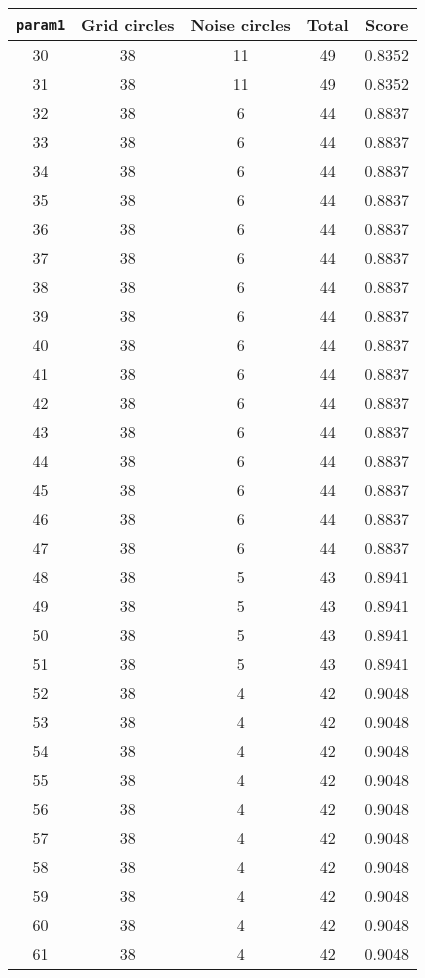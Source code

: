 \documentclass[letterpaper, 12pt]{article}
\begin{document}
\begin{longtable}{|c|c|c|c|c|}
\hline
\textbf{\texttt{param1}} & \textbf{Grid circles} & \textbf{Noise circles} & \textbf{Total} & \textbf{Score} \\
\hline
30 & 38 & 11 & 49 & 0.8352 \\
\hline
31 & 38 & 11 & 49 & 0.8352 \\
\hline
32 & 38 & 6 & 44 & 0.8837 \\
\hline
33 & 38 & 6 & 44 & 0.8837 \\
\hline
34 & 38 & 6 & 44 & 0.8837 \\
\hline
35 & 38 & 6 & 44 & 0.8837 \\
\hline
36 & 38 & 6 & 44 & 0.8837 \\
\hline
37 & 38 & 6 & 44 & 0.8837 \\
\hline
38 & 38 & 6 & 44 & 0.8837 \\
\hline
39 & 38 & 6 & 44 & 0.8837 \\
\hline
40 & 38 & 6 & 44 & 0.8837 \\
\hline
41 & 38 & 6 & 44 & 0.8837 \\
\hline
42 & 38 & 6 & 44 & 0.8837 \\
\hline
43 & 38 & 6 & 44 & 0.8837 \\
\hline
44 & 38 & 6 & 44 & 0.8837 \\
\hline
45 & 38 & 6 & 44 & 0.8837 \\
\hline
46 & 38 & 6 & 44 & 0.8837 \\
\hline
47 & 38 & 6 & 44 & 0.8837 \\
\hline
48 & 38 & 5 & 43 & 0.8941 \\
\hline
49 & 38 & 5 & 43 & 0.8941 \\
\hline
50 & 38 & 5 & 43 & 0.8941 \\
\hline
51 & 38 & 5 & 43 & 0.8941 \\
\hline
52 & 38 & 4 & 42 & 0.9048 \\
\hline
53 & 38 & 4 & 42 & 0.9048 \\
\hline
54 & 38 & 4 & 42 & 0.9048 \\
\hline
55 & 38 & 4 & 42 & 0.9048 \\
\hline
56 & 38 & 4 & 42 & 0.9048 \\
\hline
57 & 38 & 4 & 42 & 0.9048 \\
\hline
58 & 38 & 4 & 42 & 0.9048 \\
\hline
59 & 38 & 4 & 42 & 0.9048 \\
\hline
60 & 38 & 4 & 42 & 0.9048 \\
\hline
61 & 38 & 4 & 42 & 0.9048 \\

\end{longtable}
\end{document}

